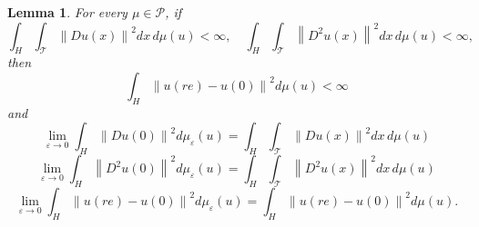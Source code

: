 \documentclass[11pt]{preprint}
\newtheorem{lemma}[theorem]{Lemma}
\begin{document}
\begin{lemma}
For every $\mu\in\mathcal{P}$, if
\[
\int_{H}\int_{\mathcal{T}}\left\|  Du\left(  x\right)  \right\|  ^{2}%
dx\,d\mu\left(  u\right)  <\infty,\quad\int_{H}\int_{\mathcal{T}}\left\|
D^{2}u\left(  x\right)  \right\|  ^{2}dx\,d\mu\left(  u\right)  <\infty,
\]
then
\[
\int_{H}\left\|  u\left(  re\right)  -u\left(  0\right)  \right\|  ^{2}%
d\mu\left(  u\right)  <\infty
\]
and
\[
\lim_{\varepsilon\rightarrow0}\int_{H}\left\|  Du\left(  0\right)  \right\|
^{2}d\mu_{\varepsilon}\left(  u\right)  =\int_{H}\int_{\mathcal{T}}\left\|
Du\left(  x\right)  \right\|  ^{2}dx\,d\mu\left(  u\right)
\]%
\[
\lim_{\varepsilon\rightarrow0}\int_{H}\left\|  D^{2}u\left(  0\right)
\right\|  ^{2}d\mu_{\varepsilon}\left(  u\right)  =\int_{H}\int_{\mathcal{T}%
}\left\|  D^{2}u\left(  x\right)  \right\|  ^{2}dx\,d\mu\left(  u\right)
\]%
\[
\lim_{\varepsilon\rightarrow0}\int_{H}\left\|  u\left(  re\right)  -u\left(
0\right)  \right\|  ^{2}d\mu_{\varepsilon}\left(  u\right)  =\int_{H}\left\|
u\left(  re\right)  -u\left(  0\right)  \right\|  ^{2}d\mu\left(  u\right)  .
\]
\end{lemma}
\end{document}
